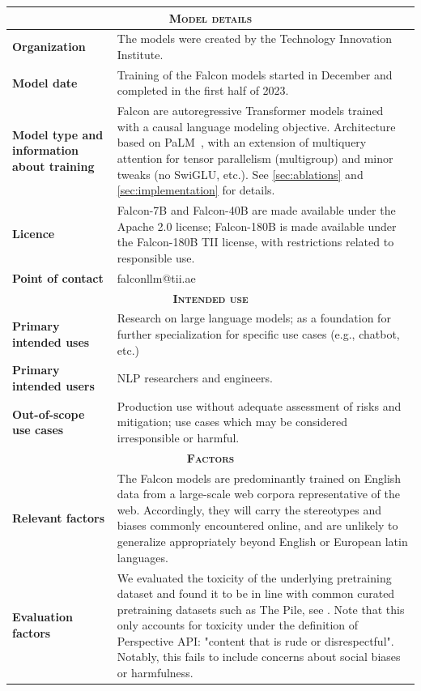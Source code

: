 \documentclass{article}
\begin{document}
\begin{longtable}{p{4cm}|p{9cm}}
    \toprule
    \multicolumn{2}{c}{\textsc{\textbf{Model details}}} \\
    \midrule
    \textbf{Organization} & The models were created by the Technology Innovation Institute. \\ \midrule
    \textbf{Model date} & Training of the Falcon models started in December and completed in the first half of 2023. \\ \midrule
    \textbf{Model type and information about training} & Falcon are autoregressive Transformer models trained with a causal language modeling objective. Architecture based on PaLM~\cite{palm}, with an extension of multiquery attention for tensor parallelism (multigroup) and minor tweaks (no SwiGLU, etc.). See \cref{sec:ablations} and \cref{sec:implementation} for details. \\ \midrule
    \textbf{Licence} & Falcon-7B and Falcon-40B are made available under the Apache 2.0 license; Falcon-180B is made available under the Falcon-180B TII license, with restrictions related to responsible use. \\ \midrule
    \textbf{Point of contact} & falconllm@tii.ae \\ \midrule
    \multicolumn{2}{c}{\textsc{\textbf{Intended use}}} \\ \midrule
    \textbf{Primary intended uses} & Research on large language models; as a foundation for further specialization for specific use cases (e.g., chatbot, etc.) \\ \midrule
    \textbf{Primary intended users} & NLP researchers and engineers. \\ \midrule
    \textbf{Out-of-scope use cases} & Production use without adequate assessment of risks and mitigation; use cases which may be considered irresponsible or harmful. \\ \midrule
    \multicolumn{2}{c}{\textsc{\textbf{Factors}}} \\ \midrule
    \textbf{Relevant factors} & The Falcon models are predominantly trained on English data from a large-scale web corpora representative of the web. Accordingly, they will carry the stereotypes and biases commonly encountered online, and are unlikely to generalize appropriately beyond English or European latin languages. \\ \midrule
    \textbf{Evaluation factors} & We evaluated the toxicity of the underlying pretraining dataset and found it to be in line with common curated pretraining datasets such as The Pile, see \citet{refinedweb}. Note that this only accounts for toxicity under the definition of Perspective API: "content that is rude or disrespectful". Notably, this fails to include concerns about social biases or harmfulness. \\ \midrule

\end{longtable}
\end{document}
